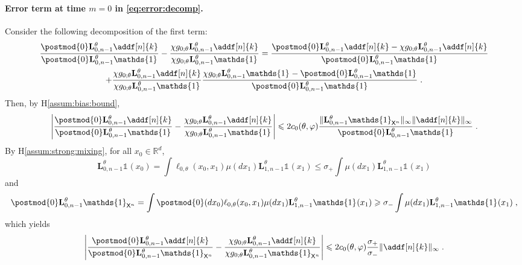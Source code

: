 \documentclass{article}
\newcommand{\uksymbol}{\ell}
\newcommand{\ud}[1]{\uksymbol_{#1}}
\newcommand{\1}{\mathbbm{1}}
\newcommand{\uk}[1]{\mathbf{L}_{#1}}
\newcommand{\Xset}{\mathsf{X}}
\newcommand{\md}[1]{g_{#1}}
\newcommand{\parvec}{\theta}
\def\1{\mathds{1}}
\newcommand{\eqsp}{\;}
\begin{document}
\paragraph{Error term at time $m=0$ in \eqref{eq:error:decomp}. }Consider the following decomposition of the first term:
\begin{multline*}
\frac{\postmod{0} \uk{0, n - 1}^\theta \addf[n]{k}}{\postmod{0} \uk{0, n - 1}^\theta \1_{}} - \frac{\chi \md{0;\parvec}\uk{0, n - 1}^\theta \addf[n]{k}}{\chi\md{0;\parvec}\uk{0, n - 1}^\theta \1_{}} = \frac{\postmod{0} \uk{0, n - 1}^\theta \addf[n]{k}-\chi \md{0;\parvec}\uk{0, n - 1}^\theta \addf[n]{k}}{\postmod{0} \uk{0, n - 1}^\theta \1_{}} \\
+  \frac{\chi \md{0;\parvec}\uk{0, n - 1}^\theta \addf[n]{k}}{\chi\md{0;\parvec}\uk{0, n - 1}^\theta \1_{}}\frac{\chi \md{0;\parvec}\uk{0, n - 1}^\theta \1_{} - \postmod{0} \uk{0, n - 1}^\theta \1_{}}{\postmod{0} \uk{0, n - 1}^\theta \1_{}} \eqsp.
\end{multline*}
Then, by H\ref{assum:bias:bound},
$$
\left|\frac{\postmod{0} \uk{0, n - 1}^\theta \addf[n]{k}}{\postmod{0} \uk{0, n - 1}^\theta \1_{}} - \frac{\chi \md{0;\parvec}\uk{0, n - 1}^\theta \addf[n]{k}}{\chi\md{0;\parvec}\uk{0, n - 1}^\theta \1_{}}\right|\leqslant 2c_0(\theta,\varphi)\frac{\| \uk{0, n - 1}^\theta \1_{\Xset^n}\|_\infty\|\addf[n]{k}\|_\infty}{\postmod{0} \uk{0, n - 1}^\theta \1_{}}\eqsp.
$$
By H\ref{assum:strong:mixing}, for all $x_0\in \mathbb{R}^d$,
$$
\uk{0, n - 1}^\theta \1_{}(x_0) = \int  \ud{0,\parvec}(x_0, x_{1})\mu(d x_1)\uk{1, n - 1}^\theta \1_{}(x_1)\leqslant \sigma_+  \int \mu(d x_1)\uk{1, n - 1}^\theta \1_{}(x_1)
$$
and 
$$
\postmod{0} \uk{0, n - 1}^\theta \1_{\Xset^n} = \int \postmod{0} (dx_0)\ud{0,\parvec}(x_0, x_{1})\mu(d x_1)\uk{1, n - 1}^\theta \1_{}(x_1)\geqslant \sigma_-  \int \mu(d x_1)\uk{1, n - 1}^\theta \1_{}(x_1)\eqsp,
$$
which yields
$$
\left|\frac{\postmod{0} \uk{0, n - 1}^\theta \addf[n]{k}}{\postmod{0} \uk{0, n - 1}^\theta \1_{\Xset^n}} - \frac{\chi \md{0;\parvec}\uk{0, n - 1}^\theta \addf[n]{k}}{\chi\md{0;\parvec}\uk{0, n - 1}^\theta \1_{\Xset^n}}\right|\leqslant 2c_0(\theta,\varphi)\frac{\sigma_+}{\sigma_-}\|\addf[n]{k}\|_\infty\eqsp.
$$
\end{document}
